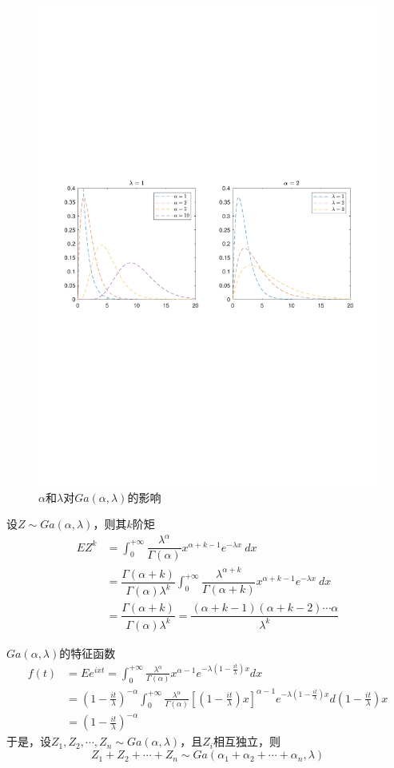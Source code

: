 \begin{figure}[htbp]
    \centering
    \includegraphics[width =.7\textwidth]{image/gamma.pdf}
    \caption{$\alpha$和$\lambda$对$Ga(\alpha, \lambda)$的影响}
    \label{fig:gamma}
\end{figure}

设$Z\sim Ga(\alpha, \lambda)$，则其$k$阶矩
\[
    \begin{array}{ll}
        EZ^{k}& = \displaystyle\int_{0}^{+\infty} \dfrac{\lambda^\alpha}{\Gamma(\alpha)}x^{\alpha+k-1}e^{-\lambda x}\ dx \\
        & = \dfrac{\Gamma(\alpha+k)}{\Gamma(\alpha)\lambda^k}\displaystyle\int_{0}^{+\infty} \dfrac{\lambda^{\alpha + k}}{\Gamma(\alpha+k)}x^{\alpha+k-1}e^{-\lambda x}\ dx \\
        &=\dfrac{\Gamma(\alpha+k)}{\Gamma(\alpha)\lambda^k} = \dfrac{(\alpha+k-1)(\alpha+k-2)\cdots \alpha}{\lambda^k}
    \end{array}
\]

$Ga(\alpha, \lambda)$的\textcolor{thid1}{特征函数}
\[
    \begin{aligned}
        f(t)& =Ee^{ixt}=\int_{0}^{+\infty}\frac{\lambda^{\alpha}}{\Gamma(\alpha)}x^{\alpha-1}e^{-\lambda(1-\frac{it}{\lambda})x}dx  \\
        &=(1-\frac{it}{\lambda})^{-\alpha}\int_{0}^{+\infty}\frac{\lambda^{\alpha}}{\Gamma(\alpha)}[(1-\frac{it}{\lambda})x]^{\alpha-1}e^{-\lambda(1-\frac{it}{\lambda})x}d(1-\frac{it}{\lambda})x \\
        &=(1-\frac{it}{\lambda})^{-\alpha}
    \end{aligned}
\]
于是，设$Z_1,Z_2,\cdots,Z_n\sim Ga(\alpha, \lambda)$，且$Z_i$相互独立，则
\[
    Z_1+Z_2+\cdots+Z_n\sim Ga(\alpha_1+\alpha_2+\cdots+\alpha_n,\lambda)
\]


